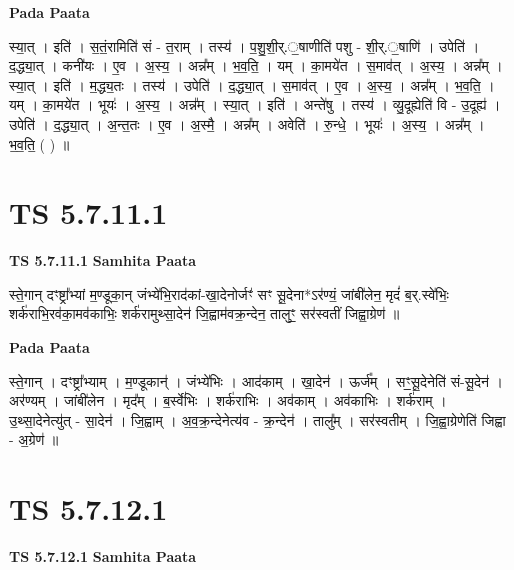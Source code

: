 \documentclass[17pt]{extarticle}
\begin{document}
\textbf{Pada Paata} \newline

स्या॒त् । इति॑ । स॒तं॒रामिति॑ सं - त॒राम् । तस्य॑ । प॒शु॒शी॒र्.॒षाणीति॑ पशु - शी॒र्.॒षाणि॑ । उपेति॑ । द॒द्ध्या॒त् । कनी॑यः । ए॒व । अ॒स्य॒ । अन्न᳚म् । भ॒व॒ति॒ । यम् । का॒मये॑त । स॒माव॑त् । अ॒स्य॒ । अन्न᳚म् । स्या॒त् । इति॑ । म॒द्ध्य॒तः । तस्य॑ । उपेति॑ । द॒द्ध्या॒त् । स॒माव॑त् । ए॒व । अ॒स्य॒ । अन्न᳚म् । भ॒व॒ति॒ । यम् । का॒मये॑त । भूयः॑ । अ॒स्य॒ । अन्न᳚म् । स्या॒त् । इति॑ । अन्ते॑षु । तस्य॑ । व्यु॒दूह्येति॑ वि - उ॒दूह्य॑ । उपेति॑ । द॒द्ध्या॒त् । अ॒न्त॒तः । ए॒व । अ॒स्मै॒ । अन्न᳚म् । अवेति॑ । रु॒न्धे॒ । भूयः॑ । अ॒स्य॒ । अन्न᳚म् । भ॒व॒ति॒ ( ) ॥  \newline




\section*{ TS 5.7.11.1 }

\textbf{TS 5.7.11.1 } \newline
\textbf{Samhita Paata} \newline

स्ते॒गान् दꣳष्ट्रा᳚भ्यां म॒ण्डूका॒न् जंभ्ये॑भि॒राद॑कां-खा॒देनोर्जꣳ॑ सꣳ सू॒देना*ऽर॑ण्यं॒ जांबी॑लेन॒ मृदं॑ ब॒र्.स्वे॑भिः॒ शर्क॑राभि॒रव॑का॒मव॑काभिः॒ शर्क॑रामुथ्सा॒देन॑ जि॒ह्वाम॑वक्र॒न्देन॒ तालुꣳ॒॒ सर॑स्वतीं जिह्वा॒ग्रेण॑ ॥ \newline

\textbf{Pada Paata} \newline

स्ते॒गान् । दꣳष्ट्रा᳚भ्याम् । म॒ण्डूकान्॑ । जंभ्ये॑भिः । आद॑काम् । खा॒देन॑ । ऊर्ज᳚म् । सꣳ॒॒सू॒देनेति॑ सं-सू॒देन॑ । अर॑ण्यम् । जांबी॑लेन । मृद᳚म् । ब॒र्स्वे॑भिः । शर्क॑राभिः । अव॑काम् । अव॑काभिः । शर्क॑राम् । उ॒थ्सा॒देनेत्यु॑त् - सा॒देन॑ । जि॒ह्वाम् । अ॒व॒क्र॒न्देनेत्य॑व - क्र॒न्देन॑ । तालु᳚म् । सर॑स्वतीम् । जि॒ह्वा॒ग्रेणेति॑ जिह्वा - अ॒ग्रेण॑ ॥  \newline




\section*{ TS 5.7.12.1 }

\textbf{TS 5.7.12.1 } \newline
\textbf{Samhita Paata} \newline
\end{document}
